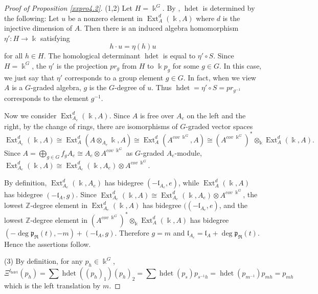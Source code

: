 \begin{proof}[Proof of Proposition \ref{xxpro4.2}]
(1,2) Let $H=\Bbbk^G$.
By \cite[Proposition 5.3(d)]{KKZ3},
$\operatorname{hdet}$ is determined
by the following:
Let $u$ be a nonzero element in $\operatorname{Ext}^d_A(\Bbbk, A)$ where $d$ is
the injective dimension of $A$. Then there is an induced 
algebra homomorphism 
$\eta': H \to \Bbbk$ satisfying
$$h\cdot u= \eta(h) u$$
for all $h\in H$. The homological determinant $\operatorname{hdet}$ is equal 
to $\eta'\circ S$. Since 
$H=\Bbbk^G$, the $\eta'$ is the projection $pr_g$ from $H$ to $\Bbbk p_g$ for
some $g\in G$. In this case, we just say that $\eta'$
corresponds to a group element $g\in G$.
In fact, when we view $A$ is a $G$-graded algebra, $g$ is the
$G$-degree of $u$. Thus $\operatorname{hdet}=\eta' \circ S=pr_{g^{-1}}$ 
corresponds to the element $g^{-1}$. 

Now we consider $\operatorname{Ext}^d_{A_e}(\Bbbk,A)$. Since $A$ is free over $A_e$
on the left and the right, by the change of rings, there are 
isomorphisms of $G$-graded vector spaces
$$\operatorname{Ext}^d_{A_e}(\Bbbk,A)\cong
\operatorname{Ext}^d_{A}(A\otimes_{A_e} \Bbbk, A)\cong
\operatorname{Ext}^d_{A}(A^{cov\; \Bbbk^G}, A)
\cong (A^{cov\; \Bbbk^G})^* \otimes_\Bbbk \operatorname{Ext}^d_{A}(\Bbbk,A).$$
Since $A=\bigoplus_{g\in G} f_g A_e\cong A_e\otimes A^{cov\; \Bbbk^G}$
as $G$-graded $A_e$-module, $\operatorname{Ext}^d_{A_e}(\Bbbk,A)
\cong \operatorname{Ext}^d_{A_e}(\Bbbk, A_e)\otimes A^{cov\; \Bbbk^G}$. 

By definition, $\operatorname{Ext}^d_{A_e}(\Bbbk,A_e)$ has bidegree $(-{\mathfrak l}_{A_e}, e)$, while 
$\operatorname{Ext}^d_A(\Bbbk,A)$ has bidegree $(-{\mathfrak l}_{A}, g)$. Since $\operatorname{Ext}^d_{A_e}(\Bbbk,A)
\cong \operatorname{Ext}^d_{A_e}(\Bbbk, A_e)\otimes A^{cov\; \Bbbk^G}$, the lowest ${\mathbb Z}$-degree
element in $\operatorname{Ext}^d_{A_e}(\Bbbk,A)$ has bidegree $((-{\mathfrak l}_{A_e}, e)$, and the lowest 
${\mathbb Z}$-degree element in $(A^{cov\; \Bbbk^G})^* \otimes_\Bbbk \operatorname{Ext}^d_{A}(\Bbbk,A)$ 
has bidegree $(-\deg {\mathfrak{p}}_{\Re}(t), -m)+(-{\mathfrak l}_A, g)$. Therefore $g=m$ and 
${\mathfrak l}_{A_e}={\mathfrak l}_A+\deg {\mathfrak{p}}_\Re(t)$. Hence the assertions follow.

(3) By definition, for any $p_h\in \Bbbk^G$, 
$$\Xi^l_\operatorname{hdet} (p_h)= \sum \operatorname{hdet} ((p_h)_1) (p_h)_2=\sum \operatorname{hdet} (p_s) p_{s^{-1}h}
=\operatorname{hdet}(p_{m^{-1}}) p_{mh}=p_{mh}$$
which is the left translation by $m$. 
\end{proof}

